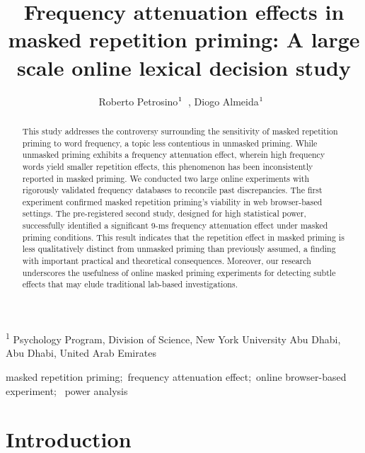\documentclass[
]{interact}
\title{Frequency attenuation effects in masked repetition priming: A
large scale online lexical decision study}
\author{Roberto
Petrosino$\textsuperscript{1}$~\orcidlink{0000-0002-8502-3070}, Diogo
Almeida$\textsuperscript{1}$~\orcidlink{0000-0003-4674-8092}}
\begin{document}
\captionsetup{labelsep=space}
\maketitle
\textsuperscript{1} Psychology Program, Division of Science, New York
University Abu Dhabi, Abu Dhabi, United Arab Emirates
\begin{abstract}
This study addresses the controversy surrounding the sensitivity of
masked repetition priming to word frequency, a topic less contentious in
unmasked priming. While unmasked priming exhibits a frequency
attenuation effect, wherein high frequency words yield smaller
repetition effects, this phenomenon has been inconsistently reported in
masked priming. We conducted two large online experiments with
rigorously validated frequency databases to reconcile past
discrepancies. The first experiment confirmed masked repetition
priming's viability in web browser-based settings. The pre-registered
second study, designed for high statistical power, successfully
identified a significant 9-ms frequency attenuation effect under masked
priming conditions. This result indicates that the repetition effect in
masked priming is less qualitatively distinct from unmasked priming than
previously assumed, a finding with important practical and theoretical
consequences. Moreover, our research underscores the usefulness of
online masked priming experiments for detecting subtle effects that may
elude traditional lab-based investigations.
\end{abstract}
\begin{keywords}
\def\sep{;\ }
masked repetition priming\sep frequency attenuation effect\sep online
browser-based experiment\sep 
power analysis
\end{keywords}

\section{Introduction}\label{sec-intro}
\end{document}
